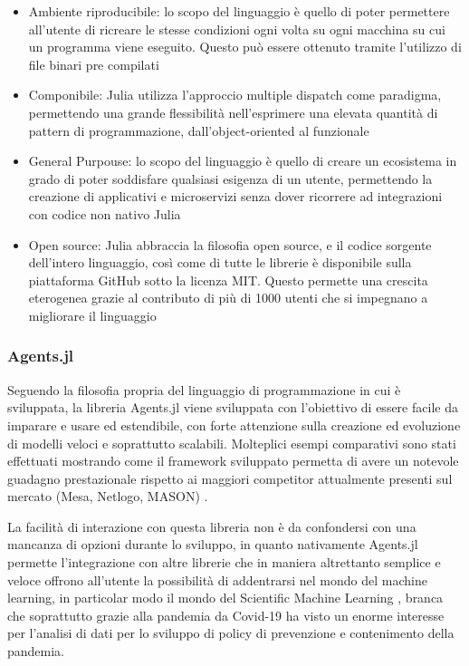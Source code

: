 \begin{itemize}
    \item Ambiente riproducibile: lo scopo del linguaggio è 
    quello di poter permettere all’utente di ricreare le 
    stesse condizioni ogni volta su ogni macchina su cui un 
    programma viene eseguito. Questo può essere ottenuto 
    tramite l’utilizzo di file binari pre compilati
    \item Componibile: Julia utilizza l’approccio multiple 
    dispatch come paradigma, permettendo una grande 
    flessibilità nell’esprimere una elevata quantità di 
    pattern di programmazione, dall’object-oriented al 
    funzionale
    \item General Purpouse: lo scopo del linguaggio è quello 
    di creare un ecosistema in grado di poter soddisfare 
    qualsiasi esigenza di un utente, permettendo la creazione 
    di applicativi e microservizi senza dover ricorrere ad 
    integrazioni con codice non nativo Julia
    \item Open source: Julia abbraccia la filosofia open source, 
    e il codice sorgente dell’intero linguaggio, così come di 
    tutte le librerie è disponibile sulla piattaforma GitHub 
    sotto la licenza MIT. Questo permette una crescita 
    eterogenea grazie al contributo di più di 1000 utenti 
    che si impegnano a migliorare il linguaggio
\end{itemize}

\subsubsection{Agents.jl}
Seguendo la filosofia propria del linguaggio di programmazione 
in cui è sviluppata, la libreria Agents.jl \cite{Agents.jl} 
viene sviluppata con l’obiettivo di essere facile da imparare e 
usare ed estendibile, con forte attenzione sulla creazione ed 
evoluzione di modelli veloci e soprattutto scalabili. 
Molteplici esempi comparativi sono stati effettuati mostrando 
come il framework sviluppato permetta di avere un notevole 
guadagno prestazionale rispetto ai maggiori competitor 
attualmente presenti sul mercato (Mesa, Netlogo, MASON) 
\cite{ABAR201713}.

La facilità di interazione con questa libreria non è da 
confondersi con una mancanza di opzioni durante lo sviluppo, 
in quanto nativamente Agents.jl permette l’integrazione con 
altre librerie che in maniera altrettanto semplice e veloce 
offrono all’utente la possibilità 
di addentrarsi nel mondo del machine learning, in particolar 
modo il mondo del Scientific Machine Learning 
\cite{rackauckas2017differentialequations}, 
branca che soprattutto grazie alla pandemia da Covid-19 ha 
visto un enorme interesse per l’analisi di dati per lo 
sviluppo di policy di prevenzione e contenimento della 
pandemia. 

